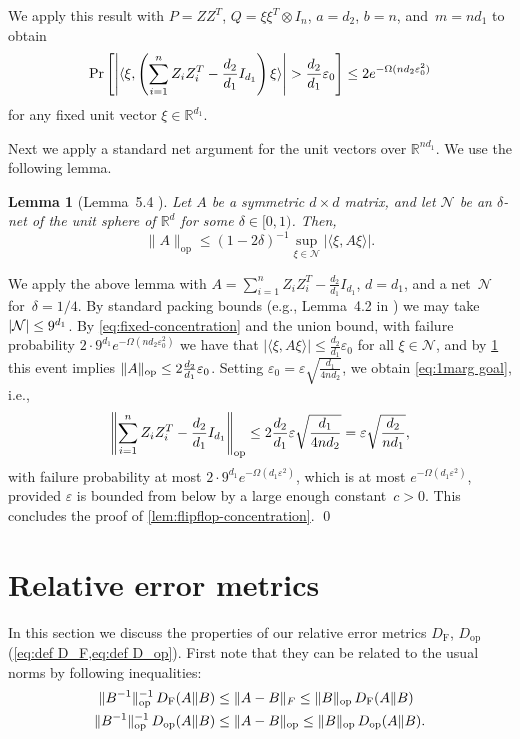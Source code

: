 \documentclass[aos]{imsart}
\newtheorem{lemma}[theorem]{Lemma}
\theoremstyle{definition}
\numberwithin{equation}{section}
\DeclareMathOperator{\op}{op}
\DeclarePairedDelimiter{\abs}{\lvert}{\rvert}
\DeclarePairedDelimiter{\norm}{\lVert}{\rVert}
\newcommand{\R}{{\mathbb{R}}}
\newcommand{\eps}{\varepsilon}
\newcommand{\DF}{D_{\operatorname{F}}}
\newcommand{\Dop}{D_{\operatorname{op}}}
\begin{document}
\begin{appendix}
We apply this result with $P = ZZ^T$, $Q = \xi \xi^T \otimes I_n$, $a = d_2$, $b = n$, and~$m = n d_1$ to obtain
\begin{align}\label{eq:fixed-concentration}
  \Pr\left[ \abs*{\langle \xi, \left( \sum_{i = 1}^n Z_i Z_i^{T} - \frac{d_2}{d_1} I_{d_1} \right) \xi \rangle} > \frac{d_2}{d_1} \eps_0 \right]
\leq 2 e^{ - \Omega( n d_2 \eps_0^{2} ) }
\end{align}
for any fixed unit vector $\xi\in\R^{d_1}$.

Next we apply a standard net argument for the unit vectors over $\R^{nd_1}$.
We use the following lemma.

\begin{lemma}[Lemma~5.4 \cite{vershynin2010introduction}]\label{lem:versh-net}
Let $A$ be a symmetric $d\times d$ matrix, and let $\mathcal{N}$ be an $\delta$-net of the unit sphere of $\R^d$ for some $\delta \in [0,1)$.
Then,
$$\|A\|_{\op} \leq (1 - 2 \delta)^{-1} \sup_{\xi \in \mathcal{N}} | \langle \xi, A \xi \rangle|.$$
\end{lemma}
We apply the above lemma with $A = \sum_{i = 1}^n Z_i Z_i^{T} - \frac{d_2}{d_1} I_{d_1}$, $d = d_1$, and a net~$\mathcal N$ for~$\delta = 1/4$.
By standard packing bounds (e.g., Lemma~4.2 in \cite{vershynin2010introduction}) we may take $\abs{\mathcal{N}} \leq 9^{d_1}$.
By \cref{eq:fixed-concentration} and the union bound, with failure probability $2 \cdot 9^{d_1} e^{- \Omega (n d_2 \eps_0^2)}$ we have that $|\langle \xi , A \xi \rangle| \leq \frac{d_2}{d_1} \eps_0$ for all $\xi \in \mathcal{N}$, and by \cref{lem:versh-net} this event implies $\norm{A}_{\op} \leq 2  \frac{d_2}{d_1} \eps_0$.
Setting $\eps_0 = \eps \sqrt{\frac{d_1}{4n d_2}}$, we obtain \cref{eq:1marg goal}, i.e.,
\begin{align*}
  \norm*{\sum_{i = 1}^n Z_i Z_i^{T} - \frac{d_2}{d_1} I_{d_1}}_{\op}
\leq 2 \frac{d_2}{d_1} \eps \sqrt{\frac{d_1}{4n d_2}}
= \eps \sqrt{\frac{d_2}{n d_1}},
\end{align*}
with failure probability at most $2 \cdot 9^{d_1} e^{- \Omega(d_1 \eps^2)}$, which is at most $e^{ - \Omega(d_1 \eps^2)}$, provided $\eps$ is bounded from below by a large enough constant~$c>0$.
This concludes the proof of \cref{lem:flipflop-concentration}. \qed

\section{Relative error metrics}\label{sec:rel-error}
In this section we discuss the properties of our relative error metrics $\DF$, $\Dop$ (\cref{eq:def D_F,eq:def D_op}).
First note that they can be related to the usual norms by following inequalities:
\begin{align}
\label{eq:D_F rel vs abs}
\|B^{-1}\|_{\op}^{-1} \, \DF(A\Vert B)&\leq \norm{A - B}_F \leq \norm{B}_{\op} \, \DF(A\Vert B)\\
\label{eq:D_op rel vs abs}
\|B^{-1}\|_{\op}^{-1} \, \Dop(A\Vert B) &\leq \norm{A  - B}_{\op} \leq \norm{B}_{\op} \, \Dop(A \Vert B).
\end{align}


\end{appendix}
\end{document}
